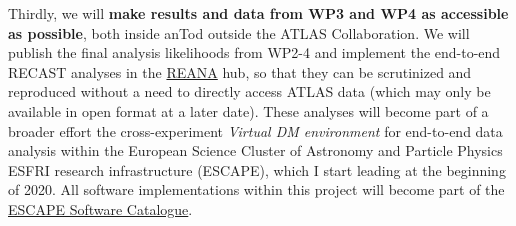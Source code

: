 Thirdly, we will \textbf{make results and data from WP3 and WP4 as accessible as possible}, both inside anTod outside the ATLAS Collaboration. 
We will publish the final analysis likelihoods from WP2-4 and implement the end-to-end RECAST analyses in the \href{http://reanahub.io/#documentation}{REANA} hub, %
so that they can be scrutinized and reproduced without a need to directly access ATLAS data (which may only be available in open format at a later date).
These analyses will become part of a broader effort the cross-experiment \textit{Virtual DM environment} for end-to-end data analysis within the European Science Cluster of Astronomy and Particle Physics ESFRI research infrastructure (ESCAPE), which I start leading at the beginning of 2020. 
All software implementations within this project will become part of the \href{https://projectescape.eu/services/escape-software-data-catalogue}{ESCAPE Software Catalogue}. 


